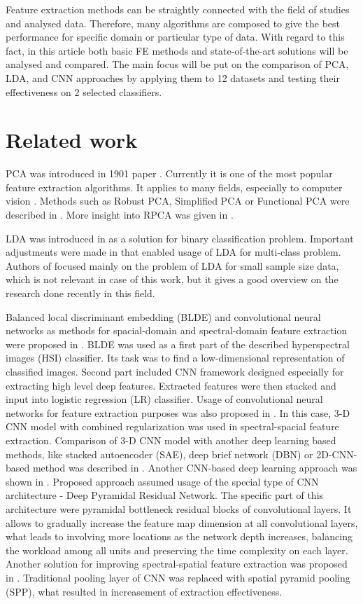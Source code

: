 \documentclass[a4paper, 10 pt, journal]{ieeeconf}
\begin{document}
Feature extraction methods can be straightly connected with the field of studies and analysed data. Therefore, many algorithms are composed to give the best performance for specific domain or particular type of data. With regard to this fact, in this article both basic FE methods and state-of-the-art solutions will be analysed and compared. The main focus will be put on the comparison of PCA, LDA, and CNN approaches by applying them to 12 datasets and testing their effectiveness on 2 selected classifiers.

\section{Related work}
PCA was introduced in 1901 paper \cite{PCA}. Currently it is one of the most popular feature extraction algorithms. It applies to many fields, especially to computer vision \cite{PCA_book}. Methods such as Robust PCA, Simplified PCA or Functional PCA were described in \cite{PCA_recent}. More insight into RPCA was given in \cite{RPCA}.

LDA was introduced in \cite{LDA} as a solution for binary classification problem. Important adjustments were made in \cite{multi_LDA} that enabled usage of LDA for multi-class problem. Authors of \cite{LDA_recent} focused mainly on the problem of LDA for small sample size data, which is not relevant in case of this work, but it gives a good overview on the research done recently in this field.

Balanced local discriminant embedding (BLDE) and convolutional neural networks as methods for spacial-domain and spectral-domain feature extraction were proposed in \cite{blde-cnn}. BLDE was used as a first part of the described hyperspectral images (HSI) classifier. Its task was to find a low-dimensional representation of classified images. Second part included CNN framework designed especially for extracting high level deep features. Extracted features were then stacked and input into logistic regression (LR) classifier. Usage of convolutional neural networks for feature extraction purposes was also proposed in \cite{cnn}. In this case, 3-D CNN model with combined regularization was used in spectral-spacial feature extraction. Comparison of 3-D CNN model with another deep learning based methods, like stacked autoencoder (SAE), deep brief network (DBN) or 2D-CNN-based method was described in \cite{cnn2}. Another CNN-based deep learning approach was shown in \cite{cnn3}. Proposed approach assumed usage of the special type of CNN architecture - Deep Pyramidal Residual Network. The specific part of this architecture were pyramidal bottleneck residual blocks of convolutional layers. It allows to gradually increase the feature map dimension at all convolutional layers, what leads to involving more locations as the network depth increases, balancing the workload among all units and preserving the time complexity on each layer. Another solution for improving spectral-spatial feature extraction was proposed in \cite{cnn4}. Traditional pooling layer of CNN was replaced with spatial pyramid pooling (SPP), what resulted in increasement of extraction effectiveness.
\end{document}

